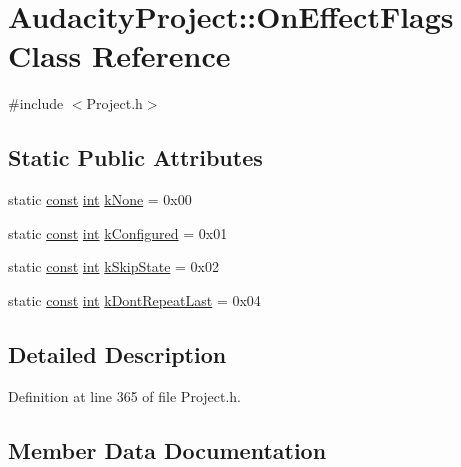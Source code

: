 \hypertarget{class_audacity_project_1_1_on_effect_flags}{}\section{Audacity\+Project\+:\+:On\+Effect\+Flags Class Reference}
\label{class_audacity_project_1_1_on_effect_flags}


{\ttfamily \#include $<$Project.\+h$>$}

\subsection*{Static Public Attributes}
\begin{DoxyCompactItemize}
\item 
static \hyperlink{getopt1_8c_a2c212835823e3c54a8ab6d95c652660e}{const} \hyperlink{xmltok_8h_a5a0d4a5641ce434f1d23533f2b2e6653}{int} \hyperlink{class_audacity_project_1_1_on_effect_flags_a8461cc6f7d62d8252c9651978c859f1d}{k\+None} = 0x00
\item 
static \hyperlink{getopt1_8c_a2c212835823e3c54a8ab6d95c652660e}{const} \hyperlink{xmltok_8h_a5a0d4a5641ce434f1d23533f2b2e6653}{int} \hyperlink{class_audacity_project_1_1_on_effect_flags_af853a6cb7bcf1ddf06f72337ec82f78a}{k\+Configured} = 0x01
\item 
static \hyperlink{getopt1_8c_a2c212835823e3c54a8ab6d95c652660e}{const} \hyperlink{xmltok_8h_a5a0d4a5641ce434f1d23533f2b2e6653}{int} \hyperlink{class_audacity_project_1_1_on_effect_flags_a4613e4014b6e6b59bd07701bcac4e44f}{k\+Skip\+State} = 0x02
\item 
static \hyperlink{getopt1_8c_a2c212835823e3c54a8ab6d95c652660e}{const} \hyperlink{xmltok_8h_a5a0d4a5641ce434f1d23533f2b2e6653}{int} \hyperlink{class_audacity_project_1_1_on_effect_flags_a6cf87127ec3cfda797503acf90ab96f2}{k\+Dont\+Repeat\+Last} = 0x04
\end{DoxyCompactItemize}


\subsection{Detailed Description}


Definition at line 365 of file Project.\+h.



\subsection{Member Data Documentation}
